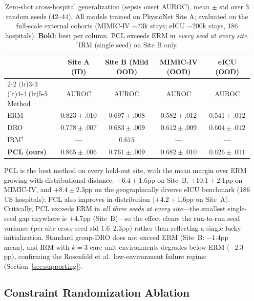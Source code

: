 \documentclass{article}
\begin{document}
\begin{table}[htbp]
\caption{Zero-shot cross-hospital generalization (sepsis onset AUROC), mean $\pm$ std over 3 random seeds (42--44). All models trained on PhysioNet Site A; evaluated on the full-scale external cohorts (MIMIC-IV $\sim$73k stays; eICU $\sim$200k stays, 186 hospitals). \textbf{Bold}: best per column. PCL exceeds ERM in \emph{every seed at every site}. $^\dagger$IRM (single seed) on Site B only.}
\label{tab:main_results}
\centering
\small
\begin{tabular}{@{}lcccc@{}}
\toprule
& \multicolumn{1}{c}{Site A (ID)} & \multicolumn{1}{c}{Site B (Mild OOD)} & \multicolumn{1}{c}{MIMIC-IV (OOD)} & \multicolumn{1}{c}{eICU (OOD)} \\
\cmidrule(lr){2-2} \cmidrule(lr){3-3} \cmidrule(lr){4-4} \cmidrule(lr){5-5}
Method & AUROC & AUROC & AUROC & AUROC \\
\midrule
ERM & $0.823{\pm}.010$ & $0.697{\pm}.008$ & $0.582{\pm}.012$ & $0.541{\pm}.012$ \\
DRO & $0.778{\pm}.007$ & $0.683{\pm}.009$ & $0.612{\pm}.009$ & $0.604{\pm}.012$ \\
IRM$^\dagger$ & --- & $0.675$ & --- & --- \\
\textbf{PCL (ours)} & $\mathbf{0.865{\pm}.006}$ & $\mathbf{0.761{\pm}.009}$ & $\mathbf{0.682{\pm}.010}$ & $\mathbf{0.626{\pm}.011}$ \\
\bottomrule
\end{tabular}
\end{table}

PCL is the best method on every held-out site, with the mean margin over ERM growing with distributional distance: $+6.4{\pm}1.6$pp on Site~B, $+10.1{\pm}2.1$pp on MIMIC-IV, and $+8.4{\pm}2.3$pp on the geographically diverse eICU benchmark (186 US hospitals); PCL also improves in-distribution ($+4.2{\pm}1.6$pp on Site~A).
Critically, PCL exceeds ERM in \emph{all three seeds at every site}---the smallest single-seed gap anywhere is $+4.7$pp (Site~B)---so the effect clears the run-to-run seed variance (per-site cross-seed std $1.6$--$2.3$pp) rather than reflecting a single lucky initialization.
Standard group-DRO does not exceed ERM (Site~B: $-1.4$pp mean), and IRM with $k{=}3$ care-unit environments degrades below ERM ($-2.3$pp), confirming the Rosenfeld et al.\ low-environment failure regime (Section~\ref{sec:supporting}).

\subsection{Constraint Randomization Ablation}
\label{sec:exp3}
\end{document}
